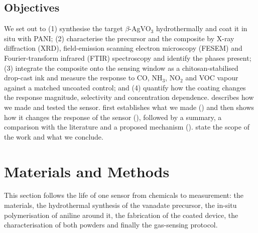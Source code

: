 \documentclass[preprint,11pt]{elsarticle}
\begin{document}
\subsection{Objectives}
\label{sec:objectives}
We set out to (1) synthesise the target $\beta$-AgVO$_3$ hydrothermally and coat it in situ with PANI; (2) characterise the precursor and the composite by X-ray diffraction (XRD), field-emission scanning electron microscopy (FESEM) and Fourier-transform infrared (FTIR) spectroscopy and identify the phases present; (3) integrate the composite onto the sensing window as a chitosan-stabilised drop-cast ink and measure the response to CO, NH$_3$, NO$_2$ and VOC vapour against a matched uncoated control; and (4) quantify how the coating changes the response magnitude, selectivity and concentration dependence.  describes how we made and tested the sensor.  first establishes what we made () and then shows how it changes the response of the sensor (), followed by a summary, a comparison with the literature and a proposed mechanism ().  state the scope of the work and what we conclude.

\section{Materials and Methods}
\label{sec:methods}
This section follows the life of one sensor from chemicals to measurement: the materials, the hydrothermal synthesis of the vanadate precursor, the in-situ polymerisation of aniline around it, the fabrication of the coated device, the characterisation of both powders and finally the gas-sensing protocol.
\end{document}
